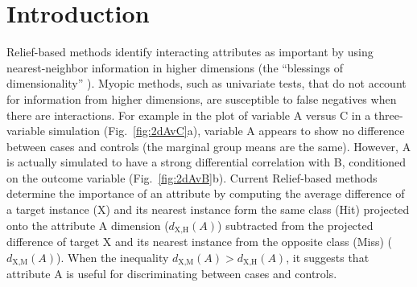 \documentclass[10pt,letterpaper]{article}\usepackage[]{graphicx}\usepackage[]{color}
\begin{document}
\linenumbers

\section*{Introduction}

Relief-based methods identify interacting attributes as important by using nearest-neighbor information in higher dimensions (the ``blessings of dimensionality'' ). Myopic methods, such as univariate tests, that do not account for information from higher dimensions, are susceptible to false negatives when there are interactions. For example in the plot of variable A versus C in a three-variable simulation (Fig.~\ref{fig:2dAvC}a), variable A appears to show no difference between cases and controls (the marginal group means are the same). However, A is actually simulated to have a strong differential correlation with B, conditioned on the outcome variable (Fig.~\ref{fig:2dAvB}b). Current Relief-based methods determine the importance of an attribute by computing the average difference of a target instance (X) and its nearest instance form the same class (Hit) projected onto the attribute A dimension ($d_{\text{X,H}}(A)$) subtracted from the projected difference of target X and its nearest instance from the opposite class (Miss) ($d_{\text{X,M}}(A)$). When the inequality $d_{\text{X,M}}(A)>d_{\text{X,H}}(A)$, it suggests that attribute A is useful for discriminating between cases and controls.  
\end{document}
